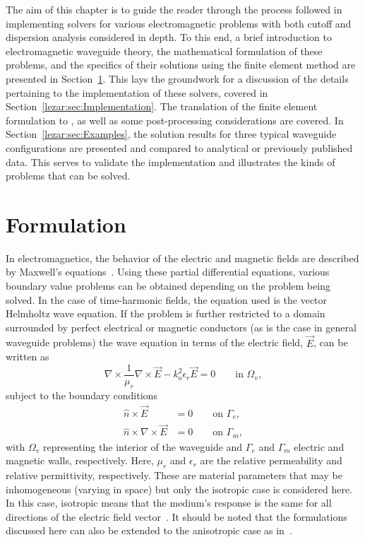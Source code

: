 The aim of this chapter is to guide the reader through the process
followed in implementing solvers for various electromagnetic problems
with both cutoff and dispersion analysis considered in depth. To this
end, a brief introduction to electromagnetic waveguide theory, the
mathematical formulation of these problems, and the specifics of their
solutions using the finite element method are presented in
Section~\ref{lezar:sec:formulation}. This lays the groundwork for a
discussion of the details pertaining to the \fenics{} implementation
of these solvers, covered in
Section~\ref{lezar:sec:Implementation}. The translation of the finite
element formulation to \fenics{}, as well as some post-processing
considerations are covered. In Section~\ref{lezar:sec:Examples}, the
solution results for three typical waveguide configurations are
presented and compared to analytical or previously published
data. This serves to validate the implementation and illustrates the
kinds of problems that can be solved.

\section{Formulation}
\label{lezar:sec:formulation}

In electromagnetics, the behavior of the electric and magnetic fields
are described by Maxwell's equations~\citep{Jin2002, Smith1997}.
Using these partial differential equations, various boundary value
problems can be obtained depending on the problem being solved.
In the case of time-harmonic fields, the equation used is the vector
Helmholtz wave equation. If the problem
is further restricted to a domain surrounded by perfect electrical or
magnetic conductors (as is the case in general waveguide problems)
the wave equation in terms of the electric field, $\vec{E}$, can be
written as~\citep{Jin2002}
\begin{equation}
    \label{eq:lezar:vector_helmholtz}
    \nabla\times\frac{1}{\mu_r}\nabla\times\vec{E} - k_o^2\epsilon_r\vec{E} = 0\qquad \text{in
    $\Omega_v$},
\end{equation}
subject to the boundary conditions
\begin{align}
    \label{eq:lezar:electric_wall_BC}
    \hat{n}\times\vec{E} &= 0\qquad \text{on $\Gamma_{e}$},\\
    \label{eq:lezar:magnetic_wall_BC}
    \hat{n}\times\nabla\times{\vec{E}}{} &= 0\qquad \text{on $\Gamma_{m}$},
\end{align}
with $\Omega_v$ representing the interior of the waveguide and
$\Gamma_{e}$ and $\Gamma_{m}$ electric and magnetic walls,
respectively. Here, $\mu_r$ and $\epsilon_r$ are the relative permeability
and relative permittivity, respectively.  These are material parameters
that may be inhomogeneous (varying in space) but only the isotropic
case is considered here. In this case, isotropic means that the
medium's response is the same for all directions of the electric field
vector~\citep{RamoWhinneryVanDuzer1994}. It should be noted that the
formulations discussed here can also be extended to the anisotropic
case as in~\citet{PolycarpouLyonsBalanis1996}.

